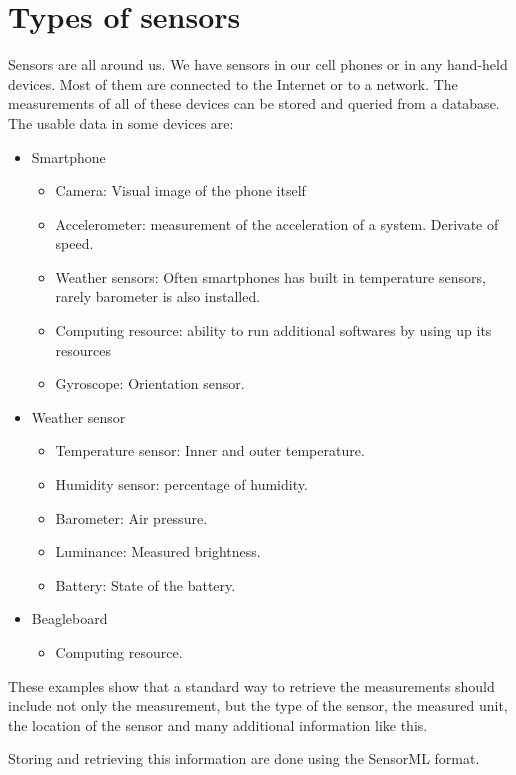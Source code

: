  \section{Types of sensors}
 
 Sensors are all around us. We have sensors in our cell phones or in any hand-held devices. Most of them are connected to the Internet or to a network. The measurements of all of these devices can be stored and queried from a database. The usable data in some devices are:
 
 \begin{itemize}
 	\item Smartphone
 	 \begin{itemize}
	 	 \item Camera: Visual image of the phone itself
	 	 \item Accelerometer: measurement of the acceleration of a system. Derivate of speed.
	 	 \item Weather sensors: Often smartphones has built in temperature sensors, rarely barometer is also installed.
	 	 \item Computing resource: ability to run additional softwares by using up its resources
	 	 \item Gyroscope: Orientation sensor.
 	 \end{itemize}
 	 \item Weather sensor
 	 \begin{itemize}
 	 \item Temperature sensor: Inner and outer temperature.
 	 \item Humidity sensor: percentage of humidity.
 	 \item Barometer: Air pressure.
 	 \item Luminance: Measured brightness.
 	 \item Battery: State of the battery.
 	 \end{itemize}
 	 \item Beagleboard
 	 \begin{itemize}
	\item Computing resource.
 	 \end{itemize}
 \end{itemize}

These examples show that a standard way to retrieve the measurements should include not only the measurement, but the type of the sensor, the measured unit, the location of the sensor and many additional information like this. 

Storing and retrieving this information are done using the SensorML format.

